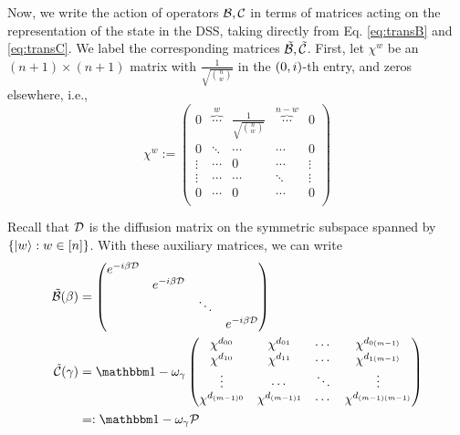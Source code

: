 \documentclass[11pt]{article}
\begin{document}
Now, we write the action of operators $\mathcal{B}, \mathcal{C}$ in terms of matrices acting on the representation of the state in the DSS, taking directly from Eq. \ref{eq:transB} and \ref{eq:transC}. We label the corresponding matrices $\tilde{\mathcal{B}}, \tilde{\mathcal{C}}$. First, let $\chi^{w}$ be an $(n+1)\times (n+1)$ matrix with $\frac{1}{\sqrt{\binom n w}}$ in the $\left(0,i\right)$-th entry, and zeros elsewhere, i.e.,
\begin{equation}
  \chi^{w} :=
  \begin{pmatrix}
    0 & \overbrace{\cdots}^{w} & \frac{1}{\sqrt{\binom n w}} & \overbrace{\cdots}^{n-w} & 0\\
    0 & \ddots  & \cdots & \cdots & 0\\
    \vdots &\cdots & 0 & \cdots & \vdots\\
    \vdots & \cdots & \cdots & \ddots & \vdots\\
    0 & \cdots & 0 & \cdots & 0\\
  \end{pmatrix}
\end{equation}

Recall that $\mathcal{D}$ is the diffusion matrix on the symmetric subspace spanned by $\left\{|w\rangle: w\in [n]\right\}$. With these auxiliary matrices, we can write
\begin{align}
  \label{eq:Bexplicit} 
  \tilde{\mc{B}}(\beta) &=
    \begin{pmatrix}
    e^{-i\beta\mc{D}} &&\\
    & e^{-i\beta\mc{D}} &\\
    && \ddots        &\\
    &&& e^{-i\beta\mc{D}}
  \end{pmatrix} \\
  \label{eq:Cexplicit}
  \tilde{\mc{C}}(\gamma) &= \id - \omega_{\gamma} \begin{pmatrix}
    \chi^{d_{00}} & \chi^{d_{01}}& \cdots & \chi^{d_{0 \paren{m-1}}}  \\
    \chi^{d_{10}} & \chi^{d_{11}} &\cdots & \chi^{d_{1 \paren{m-1}}}   \\
    \vdots & \cdots & \ddots & \vdots \\
    \chi^{d_{\paren{m-1} 0}} & \chi^{d_{\paren{m-1} 1}} &\cdots & \chi^{d_{\paren{m-1} \paren{m-1}}}   \\
  \end{pmatrix}   \\
  \label{eq:Pexplicit}
  &=: \id - \omega_\gamma\mc{P} 
\end{align}
\end{document}
